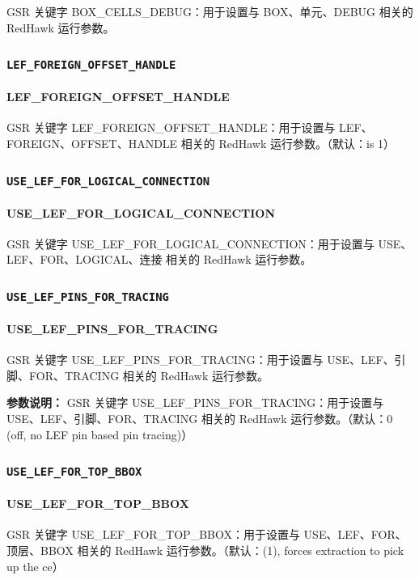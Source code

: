 GSR 关键字 BOX_CELLS_DEBUG：用于设置与 BOX、单元、DEBUG 相关的 RedHawk 运行参数。

\subsubsection{\texttt{LEF_FOREIGN_OFFSET_HANDLE}}
\paragraph*{LEF_FOREIGN_OFFSET_HANDLE}

GSR 关键字 LEF_FOREIGN_OFFSET_HANDLE：用于设置与 LEF、FOREIGN、OFFSET、HANDLE 相关的 RedHawk 运行参数。（默认：is 1）

\subsubsection{\texttt{USE_LEF_FOR_LOGICAL_CONNECTION}}
\paragraph*{USE_LEF_FOR_LOGICAL_CONNECTION}

GSR 关键字 USE_LEF_FOR_LOGICAL_CONNECTION：用于设置与 USE、LEF、FOR、LOGICAL、连接 相关的 RedHawk 运行参数。

\subsubsection{\texttt{USE_LEF_PINS_FOR_TRACING}}
\paragraph*{USE_LEF_PINS_FOR_TRACING}

GSR 关键字 USE_LEF_PINS_FOR_TRACING：用于设置与 USE、LEF、引脚、FOR、TRACING 相关的 RedHawk 运行参数。

\textbf{参数说明：}
GSR 关键字 USE\_LEF\_PINS\_FOR\_TRACING：用于设置与 USE、LEF、引脚、FOR、TRACING 相关的 RedHawk 运行参数。（默认：0 (off, no LEF pin based pin tracing)）

\subsubsection{\texttt{USE_LEF_FOR_TOP_BBOX}}
\paragraph*{USE_LEF_FOR_TOP_BBOX}

GSR 关键字 USE_LEF_FOR_TOP_BBOX：用于设置与 USE、LEF、FOR、顶层、BBOX 相关的 RedHawk 运行参数。（默认：(1), forces extraction to pick up the ce）


